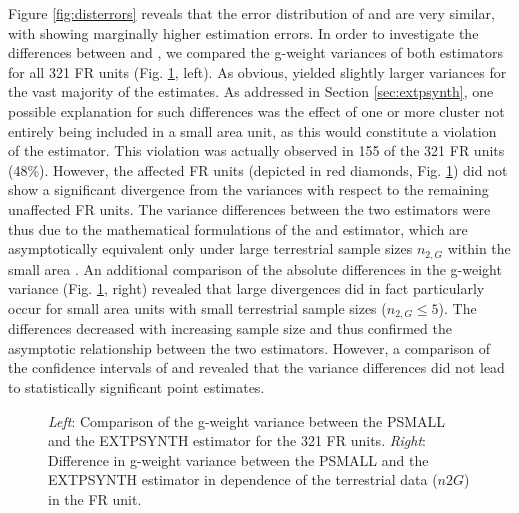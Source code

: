 Figure \ref{fig:disterrors} reveals that the error distribution of \psmall{} and \extpsynth{} are very similar, with \psmall{} showing marginally higher estimation errors. In order to investigate the differences between \psmall{} and \extpsynth{}, we compared the g-weight variances of both estimators for all 321 FR units (Fig. \ref{fig:compvar}, left). As obvious, \psmall{} yielded slightly larger variances for the vast majority of the estimates. As addressed in Section \ref{sec:extpsynth}, one possible explanation for such differences was the effect of one or more cluster not entirely being included in a small area unit, as this would constitute a violation of the \extpsynth{} estimator. This violation was actually observed in 155 of the 321 FR units (48\%). However, the affected FR units (depicted in red diamonds, Fig. \ref{fig:compvar}) did not show a significant divergence from the \psmall{} variances with respect to the remaining unaffected FR units. The variance differences between the two estimators were thus due to the mathematical formulations of the \psmall{} and \extpsynth{} estimator, which are asymptotically equivalent only under large terrestrial sample sizes $n_{2,G}$ within the small area \citep[pp.17--18]{mandallaz2016}. An additional comparison of the absolute differences in the g-weight variance (Fig. \ref{fig:compvar}, right) revealed that large divergences did in fact particularly occur for small area units with small terrestrial sample sizes ($n_{2,G} \leq 5$). The differences decreased with increasing sample size and thus confirmed the asymptotic relationship between the two estimators. However, a comparison of the confidence intervals of \psmall{} and \extpsynth{} revealed that the variance differences did not lead to statistically significant point estimates.\par

\begin{figure}[H]
	\centering
	\caption{\textit{Left}: Comparison of the g-weight variance between the PSMALL and the EXTPSYNTH estimator for the 321 FR units.
		\textit{Right}: Difference in g-weight variance between the PSMALL and the EXTPSYNTH estimator in dependence of the terrestrial data ($n2G$) in the FR unit.}
	\label{fig:compvar}
\end{figure}




